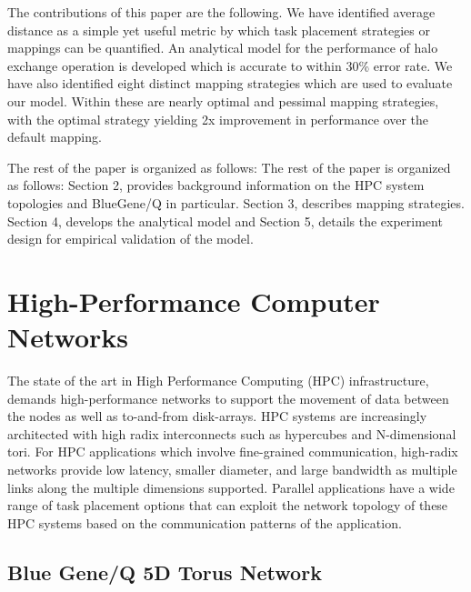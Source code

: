 \documentclass{acm_proc_article-sp}
\begin{document}
The contributions of this paper are the following. We have identified average distance as
a simple yet useful metric by which task placement strategies or mappings can be quantified.
An analytical model for the performance of halo exchange operation is developed which is accurate
to within 30\% error rate. We have also identified eight distinct mapping strategies
which are used to evaluate our model.
Within these are nearly optimal and pessimal mapping strategies, with
the optimal strategy yielding 2x improvement in performance over the default mapping.

The rest of the paper is organized as follows:
The rest of the paper is organized as follows: Section 2, provides background information on
the HPC system topologies and BlueGene/Q in particular. Section 3, describes mapping strategies.
Section 4, develops the analytical model and Section 5, details the experiment design for empirical
validation of the model.


\section{High-Performance Computer Networks}

The state of the art in High Performance Computing (HPC) infrastructure, demands high-performance networks
to support the movement of data between the nodes as well as to-and-from disk-arrays. HPC systems are
increasingly architected with high radix interconnects such as hypercubes and N-dimensional tori.
For HPC applications which involve fine-grained communication,
high-radix networks provide low latency, smaller diameter, and large bandwidth as multiple links along the multiple
dimensions supported.
Parallel applications have a wide range of task placement options that can
exploit the network topology of these HPC systems based on the communication
patterns of the application.

\subsection{Blue Gene/Q 5D Torus Network}
\end{document}
